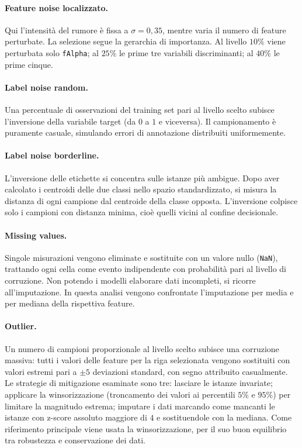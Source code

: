 \documentclass[12pt,a4paper]{article}
\begin{document}
\paragraph{Feature noise localizzato.} Qui l'intensità del rumore è fissa a $\sigma = 0{,}35$, mentre varia il numero di feature perturbate. La selezione segue la gerarchia di importanza. Al livello $10\%$ viene perturbata solo \texttt{fAlpha}; al $25\%$ le prime tre variabili discriminanti; al $40\%$ le prime cinque.

\paragraph{Label noise random.} Una percentuale di osservazioni del training set pari al livello scelto subisce l'inversione della variabile target (da $0$ a $1$ e viceversa). Il campionamento è puramente casuale, simulando errori di annotazione distribuiti uniformemente.

\paragraph{Label noise borderline.} L'inversione delle etichette si concentra sulle istanze più ambigue. Dopo aver calcolato i centroidi delle due classi nello spazio standardizzato, si misura la distanza di ogni campione dal centroide della classe opposta. L'inversione colpisce solo i campioni con distanza minima, cioè quelli vicini al confine decisionale.

\paragraph{Missing values.} Singole misurazioni vengono eliminate e sostituite con un valore nullo (\texttt{NaN}), trattando ogni cella come evento indipendente con probabilità pari al livello di corruzione. Non potendo i modelli elaborare dati incompleti, si ricorre all'imputazione. In questa analisi vengono confrontate l'imputazione per media e per mediana della rispettiva feature.

\paragraph{Outlier.} Un numero di campioni proporzionale al livello scelto subisce una corruzione massiva: tutti i valori delle feature per la riga selezionata vengono sostituiti con valori estremi pari a $\pm 5$ deviazioni standard, con segno attribuito casualmente. Le strategie di mitigazione esaminate sono tre: lasciare le istanze invariate; applicare la winsorizzazione (troncamento dei valori ai percentili $5\%$ e $95\%$) per limitare la magnitudo estrema; imputare i dati marcando come mancanti le istanze con z-score assoluto maggiore di $4$ e sostituendole con la mediana. Come riferimento principale viene usata la winsorizzazione, per il suo buon equilibrio tra robustezza e conservazione dei dati.
\end{document}
